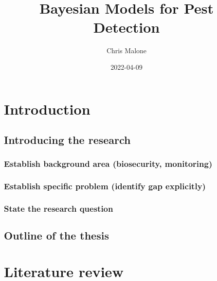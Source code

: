\documentclass[
]{book}
\title{Bayesian Models for Pest Detection}
\author{Chris Malone}
\date{2022-04-09}
\begin{document}
\maketitle

\renewcommand{\baselinestretch}{1}\normalsize
\tableofcontents
\renewcommand{\baselinestretch}{2}\normalsize

\hypertarget{introduction}{%
\chapter{Introduction}\label{introduction}}

\hypertarget{introducing-the-research}{%
\section{Introducing the research}\label{introducing-the-research}}

\hypertarget{establish-background-area-biosecurity-monitoring}{%
\subsection{Establish background area (biosecurity, monitoring)}\label{establish-background-area-biosecurity-monitoring}}

\hypertarget{establish-specific-problem-identify-gap-explicitly}{%
\subsection{Establish specific problem (identify gap explicitly)}\label{establish-specific-problem-identify-gap-explicitly}}

\hypertarget{state-the-research-question}{%
\subsection{State the research question}\label{state-the-research-question}}

\hypertarget{outline-of-the-thesis}{%
\section{Outline of the thesis}\label{outline-of-the-thesis}}

\hypertarget{lit-review}{%
\chapter{Literature review}\label{lit-review}}
\end{document}
